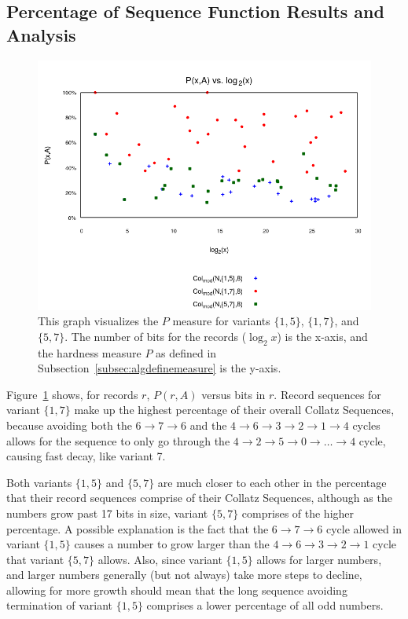 \subsection{Percentage of Sequence Function Results and Analysis} \label{subsubsec:algmulpercentage}
\begin{figure}
    \centering
    \includegraphics[scale=0.6]{ModAvoidanceAnalysisPics/P_vs_log_multi_base.png}
    \caption{This graph visualizes the $P$ measure for variants $\{1,5\}$, $\{1,7\}$, and $\{5,7\}$. The number of bits for the records ($\log_2{x}$) is the x-axis, and the hardness measure $P$ as defined in Subsection~\ref{subsec:algdefinemeasure} is the y-axis.}
    \label{fig:p_multi_vslog}
\end{figure}
Figure~\ref{fig:p_multi_vslog} shows, for records $r$, $P(r,A)$ versus bits in $r$. Record sequences for variant $\{1,7\}$ make up the highest percentage of their overall Collatz Sequences, because avoiding both the $6 \rightarrow 7 \rightarrow 6$ and the $4 \rightarrow 6 \rightarrow 3 \rightarrow 2 \rightarrow 1 \rightarrow 4$ cycles allows for the sequence to only go through the $4  \rightarrow 2 \rightarrow 5 \rightarrow 0 \rightarrow \ldots \rightarrow 4$ cycle, causing fast decay, like variant 7. \par
Both variants $\{1,5\}$ and $\{5,7\}$ are much closer to each other in the percentage that their record sequences comprise of their Collatz Sequences, although as the numbers grow past 17 bits in size, variant $\{5,7\}$ comprises of the higher percentage. A possible explanation is the fact that the $6 \rightarrow 7 \rightarrow 6$ cycle allowed in variant $\{1,5\}$ causes a number to grow larger than the $4 \rightarrow 6 \rightarrow 3 \rightarrow 2 \rightarrow 1$ cycle that variant $\{5,7\}$ allows. Also, since variant $\{1,5\}$ allows for larger numbers, and larger numbers generally (but not always) take more steps to decline, allowing for more growth should mean that the long sequence avoiding termination of variant $\{1,5\}$ comprises a lower percentage of all odd numbers.
